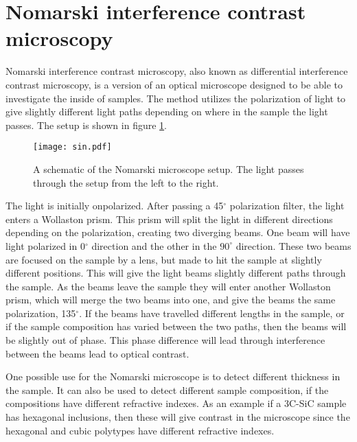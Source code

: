 
	
\section{Nomarski interference contrast microscopy}
\label{sec:nomarski}

Nomarski interference contrast microscopy, also known as differential interference contrast microscopy, is a version of an optical microscope designed to be able to investigate the inside of samples. The method utilizes the polarization of light to give slightly different light paths depending on where in the sample the light passes. The setup is shown in figure \ref{fig:nomarski}.

\begin{figure}[h]
\begin{center}
\texttt{[image: sin.pdf]}
\caption{A schematic of the Nomarski microscope setup. The light passes through the setup from the left to the right. 
\label{fig:nomarski}}
\end{center}
\end{figure}

The light is initially onpolarized. After passing a 45$^\circ$ polarization filter, the light enters a Wollaston prism. This prism will split the light in different directions depending on the polarization, creating two diverging beams. One beam will have light polarized in 0$^\circ$ direction and the other in the $90^\circ$ direction. These two beams are focused on the sample by a lens, but made to hit the sample at slightly different positions. This will give the light beams slightly different paths through the sample. As the beams leave the sample they will enter another Wollaston prism, which will merge the two beams into one, and give the beams the same polarization, 135$^\circ$. If the beams have travelled different lengths in the sample, or if the sample composition has varied between the two paths, then the beams will be slightly out of phase. This phase difference will lead through interference between the beams lead to optical contrast. 

One possible use for the Nomarski microscope is to detect different thickness in the sample. It can also be used to detect different sample composition, if the compositions have different refractive indexes. As an example if a 3C-SiC sample has hexagonal inclusions, then these will give contrast in the microscope since the hexagonal and cubic polytypes have different refractive indexes. 





